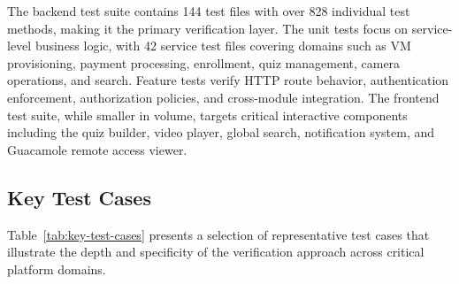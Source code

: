 The backend test suite contains 144 test files with over 828 individual test methods, making it the primary verification layer. The unit tests focus on service-level business logic, with 42 service test files covering domains such as VM provisioning, payment processing, enrollment, quiz management, camera operations, and search. Feature tests verify HTTP route behavior, authentication enforcement, authorization policies, and cross-module integration. The frontend test suite, while smaller in volume, targets critical interactive components including the quiz builder, video player, global search, notification system, and Guacamole remote access viewer.

\subsection{Key Test Cases}

Table~\ref{tab:key-test-cases} presents a selection of representative test cases that illustrate the depth and specificity of the verification approach across critical platform domains.

